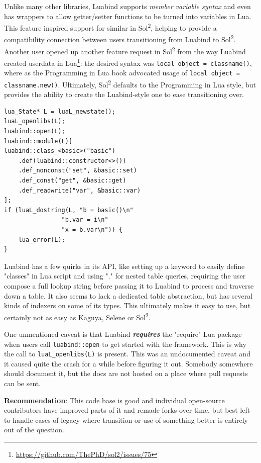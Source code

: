 \documentclass[conference,compsoc]{IEEEtran}
\newcommand{\soltwo}{Sol\textsuperscript{2}}
\begin{document}
Unlike many other libraries, Luabind supports \emph{member variable syntax} and even has wrappers to allow getter/setter functions to be turned into variables in Lua. This feature inspired support for similar in \soltwo{}, helping to provide a compatibility connection between users transitioning from Luabind to \soltwo{}. Another user opened up another feature request in \soltwo{} from the way Luabind created userdata in Lua\footnote{\url{https://github.com/ThePhD/sol2/issues/75}}: the desired syntax was \lstinline[language={[5.3]Lua}]|local object = classname()|, where as the Programming in Lua book advocated usage of \lstinline[language={[5.3]Lua}]|local object = classname.new()|. Ultimately, \soltwo{} defaults to the Programming in Lua style, but provides the ability to create the Luabind-style one to ease transitioning over.

\begin{lstlisting}[caption={A complete example for binding a class to luabind. Notice that users can access member variables with the 'a.b' syntax in Lua scripts.},label={lst:luabind-variable}]
lua_State* L = luaL_newstate();
luaL_openlibs(L);
luabind::open(L);
luabind::module(L)[
luabind::class_<basic>("basic")
	.def(luabind::constructor<>())
	.def_nonconst("set", &basic::set)
	.def_const("get", &basic::get)
	.def_readwrite("var", &basic::var)
];
if (luaL_dostring(L, "b = basic()\n"
				"b.var = i\n"
				"x = b.var\n")) {
	lua_error(L);
}
\end{lstlisting}

Luabind has a few quirks in its API, like setting up a keyword to easily define "classes" in Lua script and using "." for nested table queries, requiring the user compose a full lookup string before passing it to Luabind to process and traverse down a table. It also seems to lack a dedicated table abstraction, but has several kinds of indexers on some of its types. This ultimately makes it easy to use, but certainly not as easy as Kaguya, Selene or \soltwo{}.

One unmentioned caveat is that Luabind \emph{\textbf{requires}} the "require" Lua package when users call \lstinline|luabind::open| to get started with the framework. This is why the call to \lstinline|luaL_openlibs(L)| is present. This was an undocumented caveat and it caused quite the crash for a while before figuring it out. Somebody somewhere should document it, but the docs are not hosted on a place where pull requests can be sent.

\textbf{Recommendation}: This code base is good and individual open-source contributors have improved parts of it and remade forks over time, but best left to handle cases of legacy where transition or use of something better is entirely out of the question.
\end{document}
